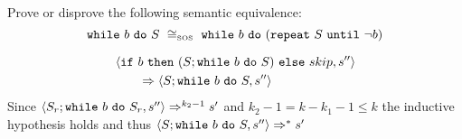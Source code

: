 \begin{exercise}{
    Prove or disprove the following semantic equivalence:
    \[ \wwhile{b}{S}\ \SOScong\ \wwhile{b}{(\wrepeat{S}{\neg b})}  \]
}
\begin{itemize}
\begin{itemize}
\begin{itemize}
\begin{itemize}
\begin{align*}
                                    &\left<\texttt{if}\ b\ \texttt{then}\ (S; \texttt{while}\ b\ \texttt{do}\ S)\ \texttt{else}\ skip, s''\right>
                                    \\&\qquad\Rightarrow \left<S; \texttt{while}\ b\ \texttt{do}\ S, s''\right>
                                \end{align*}
                                Since $\left<S_r; \texttt{while}\ b\ \texttt{do}\ S_r, s''\right> \Rightarrow^{k_2 - 1} s'$ and $k_2 - 1 = k - k_1 - 1 \leq k$ the inductive hypothesis holds and thus $\left<S; \texttt{while}\ b\ \texttt{do}\ S, s''\right> \Rightarrow^* s'$
                        \end{itemize}
                    \end{itemize}
            \end{itemize}
    \end{itemize}
\end{exercise}
